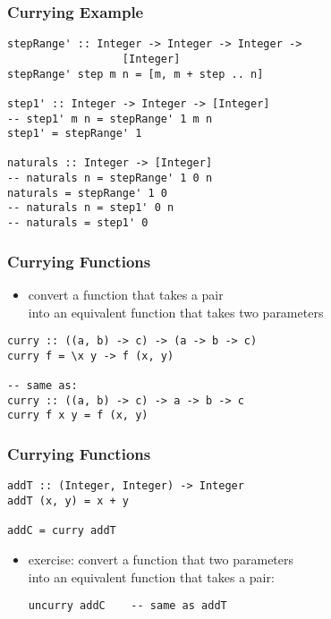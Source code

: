 \documentclass[dvipsnames]{beamer}
\theoremstyle{plain}
\begin{document}
\begin{frame}[fragile]
  \frametitle{Currying Example}

  \begin{exampleblock}{}
    \begin{lstlisting}
stepRange' :: Integer -> Integer -> Integer ->
                  [Integer]
stepRange' step m n = [m, m + step .. n]

step1' :: Integer -> Integer -> [Integer]
-- step1' m n = stepRange' 1 m n
step1' = stepRange' 1

naturals :: Integer -> [Integer]
-- naturals n = stepRange' 1 0 n
naturals = stepRange' 1 0
-- naturals n = step1' 0 n
-- naturals = step1' 0
    \end{lstlisting}
  \end{exampleblock}
\end{frame}

\begin{frame}[fragile]
  \frametitle{Currying Functions}

  \begin{itemize}
    \item convert a function that takes a pair\\
      into an equivalent function that takes two parameters
  \end{itemize}

  \begin{lstlisting}[deletekeywords={curry}]
curry :: ((a, b) -> c) -> (a -> b -> c)
curry f = \x y -> f (x, y)

-- same as:
curry :: ((a, b) -> c) -> a -> b -> c
curry f x y = f (x, y)
  \end{lstlisting}
\end{frame}

\begin{frame}[fragile]
  \frametitle{Currying Functions}

  \begin{exampleblock}{}
    \begin{lstlisting}
addT :: (Integer, Integer) -> Integer
addT (x, y) = x + y

addC = curry addT
    \end{lstlisting}
  \end{exampleblock}

  \begin{itemize}
    \item exercise: convert a function that two parameters\\
      into an equivalent function that takes a pair:\\
    \begin{lstlisting}[deletekeywords={uncurry}]
uncurry addC    -- same as addT
    \end{lstlisting}
  \end{itemize}
\end{frame}
\end{document}
